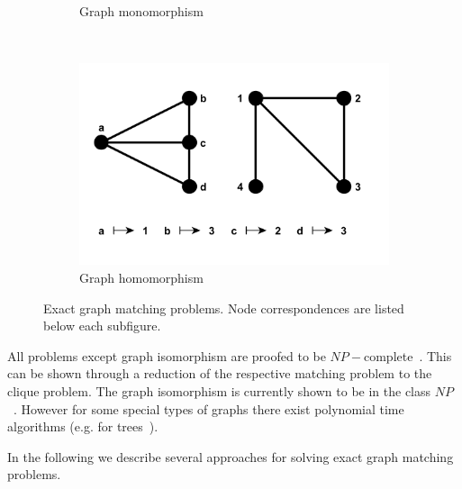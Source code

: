 \begin{figure}[h!]
\begin{subfigure}[b]{0.3\textwidth}
        \caption{Graph monomorphism}
        \label{fig:monomorphism}
    \end{subfigure}
    ~
    \begin{subfigure}[b]{0.3\textwidth}
        \includegraphics[width=\textwidth]{chapter1/fig/homomorphism}
        \caption{Graph homomorphism}
        \label{fig:homomorphism}
    \end{subfigure}
    \caption[Exact graph matching problems]{Exact graph matching problems. Node correspondences are listed below each subfigure.}\label{fig:Exact_GM}
\end{figure}

All problems except graph isomorphism are proofed to be $NP-$complete~\cite{Garey_NPComplet}. This can be shown through a reduction of the respective matching problem to the clique problem. The graph isomorphism is currently shown to be in the class $NP$~\cite{Garey_NPComplet,Schoening_GI}. However for some special types of graphs there exist polynomial time algorithms (e.g. for %
trees~\cite{Aho_Ullman, Garey_NPComplet}).

In the following we describe several approaches for solving exact graph matching problems.
